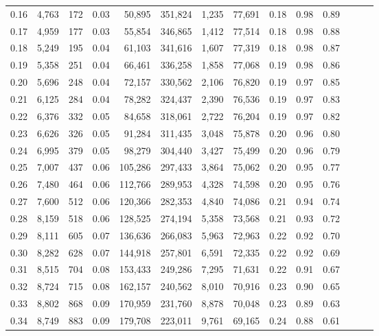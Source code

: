\begin{tabular}{rrrrrrrrrrrrrr}
0.16 &  4,763 &    172 &  0.03 &   50,895 &  351,824 &   1,235 &  77,691 &  0.18 &  0.98 &      0.89 \\
0.17 &  4,959 &    177 &  0.03 &   55,854 &  346,865 &   1,412 &  77,514 &  0.18 &  0.98 &      0.88 \\
0.18 &  5,249 &    195 &  0.04 &   61,103 &  341,616 &   1,607 &  77,319 &  0.18 &  0.98 &      0.87 \\
0.19 &  5,358 &    251 &  0.04 &   66,461 &  336,258 &   1,858 &  77,068 &  0.19 &  0.98 &      0.86 \\
0.20 &  5,696 &    248 &  0.04 &   72,157 &  330,562 &   2,106 &  76,820 &  0.19 &  0.97 &      0.85 \\
0.21 &  6,125 &    284 &  0.04 &   78,282 &  324,437 &   2,390 &  76,536 &  0.19 &  0.97 &      0.83 \\
0.22 &  6,376 &    332 &  0.05 &   84,658 &  318,061 &   2,722 &  76,204 &  0.19 &  0.97 &      0.82 \\
0.23 &  6,626 &    326 &  0.05 &   91,284 &  311,435 &   3,048 &  75,878 &  0.20 &  0.96 &      0.80 \\
0.24 &  6,995 &    379 &  0.05 &   98,279 &  304,440 &   3,427 &  75,499 &  0.20 &  0.96 &      0.79 \\
0.25 &  7,007 &    437 &  0.06 &  105,286 &  297,433 &   3,864 &  75,062 &  0.20 &  0.95 &      0.77 \\
0.26 &  7,480 &    464 &  0.06 &  112,766 &  289,953 &   4,328 &  74,598 &  0.20 &  0.95 &      0.76 \\
0.27 &  7,600 &    512 &  0.06 &  120,366 &  282,353 &   4,840 &  74,086 &  0.21 &  0.94 &      0.74 \\
0.28 &  8,159 &    518 &  0.06 &  128,525 &  274,194 &   5,358 &  73,568 &  0.21 &  0.93 &      0.72 \\
0.29 &  8,111 &    605 &  0.07 &  136,636 &  266,083 &   5,963 &  72,963 &  0.22 &  0.92 &      0.70 \\
0.30 &  8,282 &    628 &  0.07 &  144,918 &  257,801 &   6,591 &  72,335 &  0.22 &  0.92 &      0.69 \\
0.31 &  8,515 &    704 &  0.08 &  153,433 &  249,286 &   7,295 &  71,631 &  0.22 &  0.91 &      0.67 \\
0.32 &  8,724 &    715 &  0.08 &  162,157 &  240,562 &   8,010 &  70,916 &  0.23 &  0.90 &      0.65 \\
0.33 &  8,802 &    868 &  0.09 &  170,959 &  231,760 &   8,878 &  70,048 &  0.23 &  0.89 &      0.63 \\
0.34 &  8,749 &    883 &  0.09 &  179,708 &  223,011 &   9,761 &  69,165 &  0.24 &  0.88 &      0.61 \\

\end{tabular}
